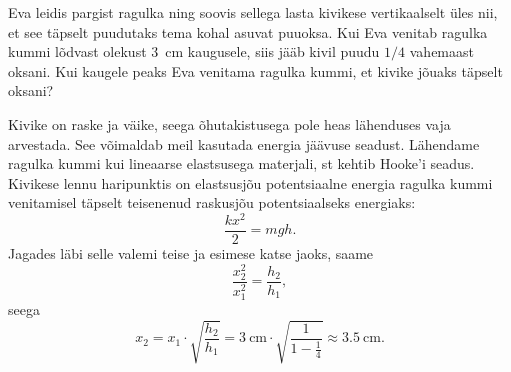 
Eva leidis pargist ragulka ning soovis sellega lasta kivikese vertikaalselt üles nii, et see täpselt puudutaks tema kohal asuvat puuoksa. Kui Eva venitab ragulka kummi lõdvast olekust \SI{3}{\cm} kaugusele, siis jääb kivil puudu $1/4$ vahemaast oksani. Kui kaugele peaks Eva venitama ragulka kummi, et kivike jõuaks täpselt oksani?


\hint

\solu
Kivike on raske ja väike, seega õhutakistusega pole heas lähenduses vaja arvestada. See võimaldab meil kasutada energia jäävuse seadust. Lähendame ragulka kummi kui lineaarse elastsusega materjali, st kehtib Hooke'i seadus. Kivikese lennu haripunktis on elastsusjõu potentsiaalne energia ragulka kummi venitamisel täpselt teisenenud raskusjõu potentsiaalseks energiaks:
\[
  \frac{kx^2}{2} = mgh.
\]
Jagades läbi selle valemi teise ja esimese katse jaoks, saame
\[
  \frac{x_2^2}{x_1^2} = \frac{h_2}{h_1},
\]
seega
\[
  x_2 = x_1 \cdot \sqrt{\frac{h_2}{h_1}} = \SI{3}{\cm} \cdot \sqrt{\frac{1}{1- \frac{1}{4}}} \approx \SI{3,5}{\cm}.
\]
\probend